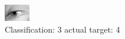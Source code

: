 \begin{figure}[h!]
\begin{center}
\includegraphics[width=0.60\columnwidth]{figures/ID3053_class_3_target_4.png}
\end{center}
\caption{ Classification: 3 actual target: 4}
\label{fig:ID3053_class_3_target_4}
\end{figure}
